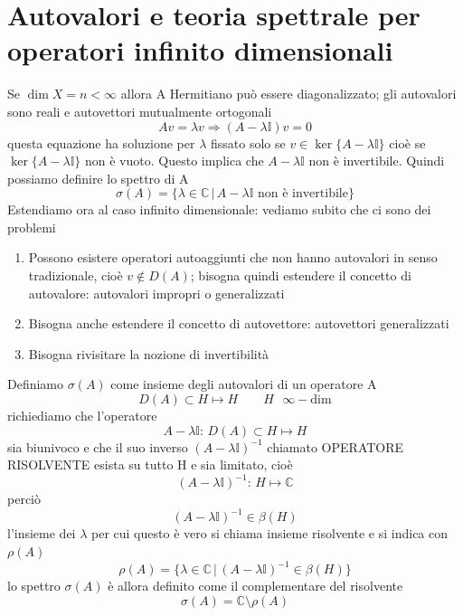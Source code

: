 \documentclass[a4paper,11pt]{report}
\theoremstyle{remark}
\theoremstyle{definition}
\newcommand{\C}{\mathbb{C}}
\begin{document}
\section{Autovalori e teoria spettrale per operatori infinito dimensionali}
Se $\dim{X} = n < \infty$ allora A Hermitiano può essere diagonalizzato; gli autovalori sono reali e autovettori mutualmente ortogonali
\begin{equation*}
	Av = \lambda v \Rightarrow (A-\lambda\mathbb{I})v =0
\end{equation*}
questa equazione ha soluzione per $\lambda$ fissato solo se $v \in \ker{\{A-\lambda\mathbb{I}\}}$ cioè se $\ker{\{A-\lambda\mathbb{I}\}}$ non è vuoto. Questo implica che $A - \lambda\mathbb{I}$ non è invertibile. Quindi possiamo definire lo spettro di A 
\begin{equation*}
	\sigma(A) = \{\lambda\in \C \, | \, A-\lambda\mathbb{I} \text{ non è invertibile}\}
\end{equation*}
Estendiamo ora al caso infinito dimensionale: vediamo subito che ci sono dei problemi
\begin{enumerate}
	\item Possono esistere operatori autoaggiunti che non hanno autovalori in senso tradizionale, cioè $v \not\in D(A)$; bisogna quindi estendere il concetto di autovalore: autovalori impropri o generalizzati
	\item Bisogna anche estendere il concetto di autovettore: autovettori generalizzati
	\item Bisogna rivisitare la nozione di invertibilità
\end{enumerate}
Definiamo $\sigma(A)$ come insieme degli autovalori di un operatore A
\begin{equation*}
	D(A) \subset H \mapsto H \qquad H \text{ $\infty-$dim}
\end{equation*}
richiediamo che l'operatore 
\begin{equation*}
	A-\lambda \mathbb{I} : \, D(A) \subset H \mapsto H
\end{equation*}
sia biunivoco e che il suo inverso ${(A-\lambda\mathbb{I})}^{-1}$ chiamato OPERATORE RISOLVENTE esista su tutto H e sia limitato, cioè
\begin{equation*}
	{(A-\lambda\mathbb{I})}^{-1} : \, H \mapsto \C
\end{equation*}
perciò
\begin{equation*}
	{(A-\lambda\mathbb{I})}^{-1} \in \beta(H)
\end{equation*}
l'insieme dei $\lambda$ per cui questo è vero si chiama insieme risolvente e si indica con $\rho(A)$
\begin{equation*}
	\rho(A) = \{\lambda\in\C \, | \, {(A-\lambda\mathbb{I})}^{-1}\in \beta(H)\}
\end{equation*}
lo spettro $\sigma(A)$ è allora definito come il complementare del risolvente
\begin{equation*}
	\sigma(A) = \C \setminus \rho(A)
\end{equation*}
\end{document}
